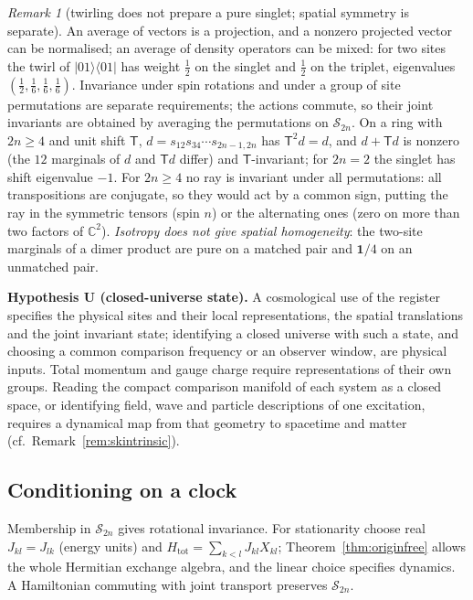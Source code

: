 \documentclass[aps,pra,onecolumn,superscriptaddress,nofootinbib,10pt]{revtex4-2}
\theoremstyle{definition}
\theoremstyle{remark}
\newtheorem{remark}[theorem]{Remark}
\newcommand{\C}{\mathbb{C}}
\begin{document}
\begin{remark}[twirling does not prepare a pure singlet; spatial symmetry is separate]\label{rem:cutransl}
An average of vectors is a projection, and a nonzero projected vector can be normalised; an average of
density operators can be mixed: for two sites the twirl of $\lvert01\rangle\langle01\rvert$ has weight $\tfrac12$ on the singlet and $\tfrac12$
on the triplet, eigenvalues $(\tfrac12,\tfrac16,\tfrac16,\tfrac16)$.  Invariance under spin rotations and under a group of site
permutations are separate requirements; the actions commute, so their joint invariants are obtained by
averaging the permutations on $\mathcal S_{2n}$.  On a ring with $2n\ge4$ and unit shift $\mathsf T$, $d=s_{12}s_{34}\cdots s_{2n-1,2n}$ has
$\mathsf T^2d=d$, and $d+\mathsf Td$ is nonzero (the $12$ marginals of $d$ and $\mathsf Td$ differ) and $\mathsf T$-invariant; for $2n=2$ the singlet
has shift eigenvalue $-1$.  For $2n\ge4$ no ray is invariant under all permutations: all transpositions are
conjugate, so they would act by a common sign, putting the ray in the symmetric tensors (spin $n$) or the
alternating ones (zero on more than two factors of $\C^2$).  \emph{Isotropy does not give spatial homogeneity}:
the two-site marginals of a dimer product are pure on a matched pair and $\mathbf1/4$ on an unmatched pair.
\end{remark}

\smallskip\noindent\textbf{Hypothesis U (closed-universe state).}  A cosmological use of the register specifies
the physical sites and their local representations, the spatial translations and the joint invariant
state; identifying a closed universe with such a state, and choosing a common comparison frequency or an
observer window, are physical inputs.  Total momentum and gauge charge require representations of their
own groups.  Reading the compact comparison manifold of each system as a closed space, or identifying
field, wave and particle descriptions of one excitation, requires a dynamical map from that geometry to
spacetime and matter (cf.\ Remark~\ref{rem:skintrinsic}).

\subsection{Conditioning on a clock}\label{sec:cuclock}
Membership in $\mathcal S_{2n}$ gives rotational invariance.  For stationarity choose real $J_{kl}=J_{lk}$ (energy units) and
$H_{\mathrm{tot}}=\sum_{k<l}J_{kl}X_{kl}$; Theorem~\ref{thm:originfree} allows the whole Hermitian exchange algebra, and the linear choice
specifies dynamics.  A Hamiltonian commuting with joint transport preserves $\mathcal S_{2n}$.
\end{document}
